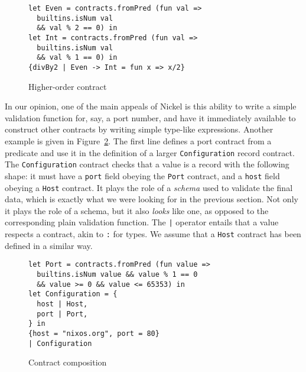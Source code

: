 \documentclass[sigplan,10pt,review,anonymous]{acmart}
\newcommand{\unsure}[2][1=]{}
\begin{document}
\begin{figure}
  \begin{center}
\begin{lstlisting}[language=nickel]
let Even = contracts.fromPred (fun val =>
  builtins.isNum val
  && val % 2 == 0) in
let Int = contracts.fromPred (fun val =>
  builtins.isNum val
  && val % 1 == 0) in
{divBy2 | Even -> Int = fun x => x/2}
\end{lstlisting}
  \end{center}
\caption{Higher-order contract}
\label{fig:contract-higher-order}
\end{figure}

In our opinion, one of the main appeals of Nickel is this ability to write a
simple validation function for, say, a port number, and have it immediately
available to construct other contracts by writing simple type-like expressions.
Another example is given in Figure~\ref{fig:contract-composition}. The first
line defines a port contract from a predicate and use it in the definition of a
larger \lstinline+Configuration+ record contract. The \lstinline+Configuration+
contract checks that a value is a record with the following shape: it must have
a \lstinline+port+ field obeying the \lstinline+Port+ contract, and a
\lstinline+host+ field obeying a \lstinline+Host+ contract. It plays the role of
a \emph{schema} used to validate the final data, which is exactly what we were
looking for in the previous section. Not only it plays the role of a schema, but
it also \emph{looks} like one, as opposed to the corresponding plain validation
function. The \lstinline+|+ operator entails that a value respects a contract,
akin to \lstinline+:+ for types. We assume that a \lstinline+Host+ contract has
been defined in a similar way. \unsure{What's missing in this section is an
    example of how contracts differ from standard dynamic type checking on some
function. Namely, the quality of error messages.}

\begin{figure}
  \begin{center}
\begin{lstlisting}[language=nickel]
let Port = contracts.fromPred (fun value =>
  builtins.isNum value && value % 1 == 0
  && value >= 0 && value <= 65353) in
let Configuration = {
  host | Host,
  port | Port,
} in
{host = "nixos.org", port = 80}
| Configuration
\end{lstlisting}
  \end{center}
\caption{Contract composition}
\label{fig:contract-composition}
\end{figure}
\end{document}
